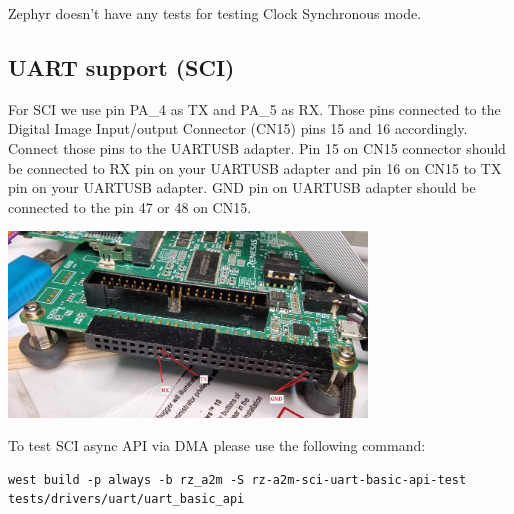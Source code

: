 \documentclass[11pt,a4paper,oneside]{article}
\begin{document}
Zephyr doesn't have any tests for testing Clock Synchronous mode.

\subsection{UART support (SCI)}\label{uart-sci-support}

For SCI we use pin PA\_4 as TX and PA\_5 as RX. Those pins connected to the
Digital Image Input/output Connector (CN15) pins 15 and 16 accordingly.
Connect those pins to the UART\-USB adapter. Pin 15 on CN15 connector should be connected to RX pin
on your UART\-USB adapter and pin 16 on CN15 to TX pin on your UART\-USB adapter. GND pin on UART\-USB adapter
should be connected to the pin 47 or 48 on CN15.

\includegraphics[width=3.75in,height=1.94in]{./media/SCI0_1.jpg}

To test SCI async API via DMA please use the following command:

\begin{lstlisting}
west build -p always -b rz_a2m -S rz-a2m-sci-uart-basic-api-test tests/drivers/uart/uart_basic_api
\end{lstlisting}
\end{document}
